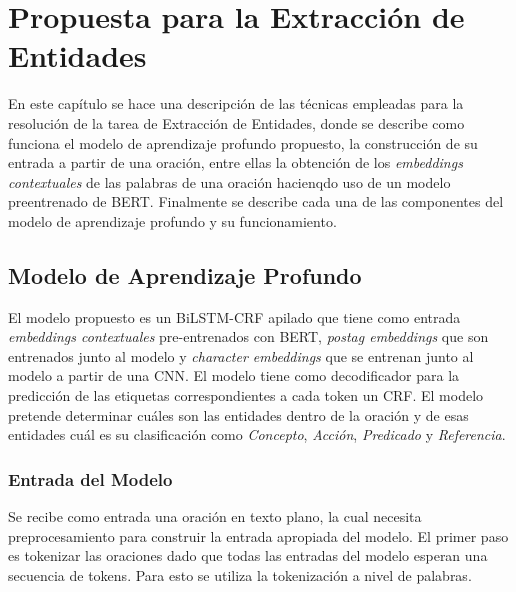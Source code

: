 \chapter{Propuesta para la Extracción de Entidades}\label{chapter:entities}


En este capítulo se hace una descripción de las técnicas empleadas para la resolución de la tarea de Extracción de Entidades, donde se describe como funciona el modelo de aprendizaje profundo propuesto, la construcci\'on de su entrada a partir de una oraci\'on, entre ellas la obtenci\'on de los \emph{embeddings contextuales} de las palabras de una oraci\'on hacienqdo uso de un modelo preentrenado de BERT. Finalmente se describe cada una de las componentes del modelo de aprendizaje profundo y su funcionamiento.


\section{Modelo de Aprendizaje Profundo}

El modelo propuesto es un BiLSTM-CRF apilado que tiene como entrada \emph{embeddings contextuales} pre-entrenados con BERT, \emph{postag embeddings} que son entrenados junto al modelo y \emph{character embeddings} que se entrenan junto al modelo a partir de una CNN. El modelo tiene como decodificador para la predicci\'on de las etiquetas correspondientes a cada token un CRF. El modelo pretende determinar cu\'ales son las entidades dentro de la oraci\'on y de esas entidades cu\'al es su clasificaci\'on como \emph{Concepto}, \emph{Acci\'on}, \emph{Predicado} y \emph{Referencia}.

\subsection{Entrada del Modelo}\label{sec:entrance}
Se recibe como entrada una oraci\'on en texto plano, la cual necesita preprocesamiento para construir la entrada apropiada del modelo. El primer paso es tokenizar las oraciones dado que todas las entradas del modelo esperan una secuencia de tokens. Para esto se utiliza la tokenizaci\'on a nivel de palabras.


